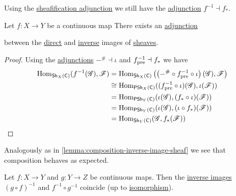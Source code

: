 \documentclass[../../main]{subfiles}
\begin{document}
Using the \hyperref[def:sheafification]{sheafification adjunction} we still have the \hyperref[def:adjoint-functors]{adjunction} \(f^{-1} \dashv f_{\ast}\).
\begin{theorem}\label{thm:direct-inverse-image-adjunction-sheaf}
  Let \(f\colon X \to Y\) be a continuous map
  There exists an \hyperref[def:adjoint-functors]{adjunction}
  \begin{center}
  \end{center}
  between the \hyperref[def:direct-image-sheaf]{direct} and \hyperref[def:inverse-image-sheaf]{inverse} images of \hyperref[def:sheaf]{sheaves}.
\end{theorem}
\begin{proof}
  Using the \hyperref[def:adjoint-functors]{adjunctions} \(-^{\#} \dashv \iota\) and \(f_{\operatorname*{pre}}^{-1} \dashv f_{\ast}\) we have
  \begin{align*}
    \operatorname{Hom}_{\mathsf{Sh}_{X}(\mathsf{C})}(f^{-1}(\mathscr{G}), \mathscr{F}) &= \operatorname{Hom}_{\mathsf{Sh}_{X}(\mathsf{C})} \left( \left( -^{\#} \circ f_{\operatorname*{pre}}^{-1} \circ \iota \right)(\mathscr{G}), \mathscr{F} \right) \\
                                                                 &\cong \operatorname{Hom}_{\mathsf{PSh}_{X}(\mathsf{C})}((f_{\operatorname*{pre}}^{-1} \circ \iota)(\mathscr{G}), \iota(\mathscr{F}))  \\
                                                                  &= \operatorname{Hom}_{\mathsf{PSh}_{Y}(\mathsf{C})}(\iota(\mathscr{G}), (f_{\ast} \circ \iota)(\mathscr{F})) \\
                                                                  &= \operatorname{Hom}_{\mathsf{PSh}_{Y}(\mathsf{C})}(\iota(\mathscr{G}), (\iota \circ f_{\ast})(\mathscr{F})) \\
                                                                  &= \operatorname{Hom}_{\mathsf{Sh}_{Y}(\mathsf{C})}(\mathscr{G}, f_{\ast}(\mathscr{F})) \qedhere
  \end{align*}
\end{proof}

Analogously as in \autoref{lemma:composition-inverse-image-sheaf} we see that composition behaves as expected.
\begin{lemma}\label{lemma:composition-inverse-image-sheaf}
  Let \(f\colon X \to Y\) and \(g\colon Y \to Z\) be continuous maps.
  Then the \hyperref[def:inverse-image-sheaf]{inverse images} \((g \circ f)^{-1}\) and \(f^{-1} \circ g^{-1}\) coincide (up to \hyperref[def:categorical-isomorphism]{isomorphism}).
\end{lemma}
\end{document}
